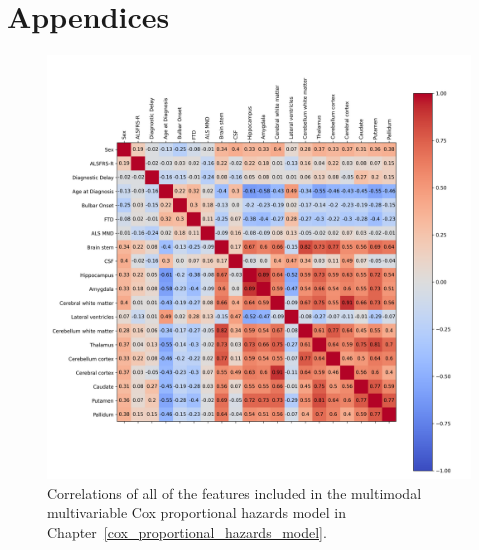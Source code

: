 
\chapter{Appendices}

\begin{figure}
    \centering
    \includegraphics[width=\textwidth]{figures/multimodal_correlation}
    \caption{Correlations of all of the features included in the multimodal multivariable Cox proportional hazards model in Chapter~\ref{cox_proportional_hazards_model}.}
    \label{fig:multimodalcorrelations}
\end{figure}

%
%
%

